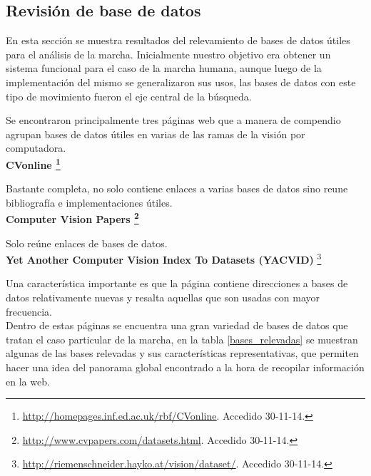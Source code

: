 \subsection{Revisión de base de datos}
\label{}
En esta sección se muestra  resultados del relevamiento de bases de datos útiles para el análisis de la marcha.
Inicialmente nuestro objetivo era obtener un sistema funcional para el caso de la marcha humana, aunque luego de la implementación del mismo se generalizaron sus usos, las bases de datos con este tipo de movimiento fueron el eje central de la búsqueda.

Se encontraron principalmente tres páginas web que a manera de compendio agrupan  bases de datos útiles en varias de las ramas de la visión por computadora.\\

\hspace{-0.7cm} \textbf{CVonline \footnote{\textcolor{blue}{\underline{\url{http://homepages.inf.ed.ac.uk/rbf/CVonline}}}. Accedido 30-11-14.} } 

Bastante completa, no solo contiene enlaces a  varias bases de datos sino reune bibliografía e implementaciones útiles.\\


\hspace{-0.7cm} \textbf{Computer Vision Papers \footnote{\textcolor{blue}{\underline{\url{ http://www.cvpapers.com/datasets.html}}}. Accedido 30-11-14.} } 

	 Solo reúne enlaces de bases de datos.\\
		

\hspace{-0.7cm} \textbf{Yet Another Computer Vision Index To Datasets (YACVID)} \footnote{\textcolor{blue}{\underline{\url{http://riemenschneider.hayko.at/vision/dataset/}}}. Accedido 30-11-14. } 	

Una característica importante es que la página contiene direcciones a bases de datos relativamente nuevas y resalta aquellas que son usadas con mayor frecuencia. \\
	

Dentro de estas páginas se encuentra una gran variedad de bases de datos que tratan el caso particular de la marcha, en la tabla \ref{bases_relevadas} se muestran algunas de las bases relevadas y sus características representativas, que permiten hacer una idea del panorama global encontrado a la hora de recopilar información en la web.  

